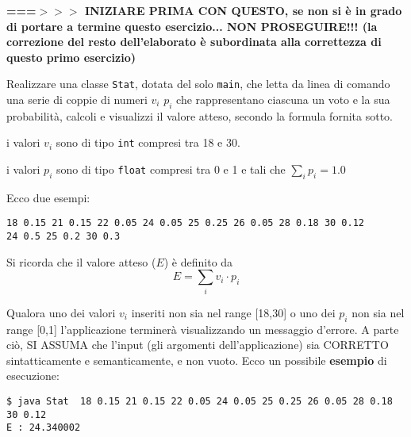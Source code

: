 \documentclass[12pt]{article}
\begin{document}
\textbf{===$>>>$ INIZIARE PRIMA CON QUESTO,
se non si è in grado di portare a termine questo esercizio...
NON PROSEGUIRE!!!
(la correzione del resto dell'elaborato è subordinata alla correttezza di questo primo esercizio)}

\medskip


Realizzare una classe \texttt{Stat}, dotata del solo \texttt{main},
che letta da linea di comando una serie di coppie di numeri $v_i$ $p_i$
che rappresentano ciascuna un voto e la sua probabilità, calcoli e visualizzi il valore atteso, secondo la formula fornita sotto.
\begin{compactitem}
\item i valori $v_i$ sono di tipo \texttt{int} compresi tra 18 e 30.
\item i valori $p_i$ sono di tipo \texttt{float} compresi tra 0 e 1 e tali che $\sum_{i} p_i = 1.0$
\end{compactitem}


Ecco due esempi:
\begin{verbatim}
18 0.15 21 0.15 22 0.05 24 0.05 25 0.25 26 0.05 28 0.18 30 0.12
24 0.5 25 0.2 30 0.3
\end{verbatim} 
Si ricorda che il valore atteso ($E$) \`e definito da
$$E = \sum_{i} v_i \cdot p_i$$

Qualora uno dei valori $v_i$ inseriti non sia nel range [18,30] o uno dei $p_i$ non sia nel range [0,1]
l'applicazione terminerà visualizzando un messaggio d'errore.
A parte ciò, SI ASSUMA che l'input (gli argomenti dell'applicazione)
sia CORRETTO sintatticamente e semanticamente, e non vuoto.
Ecco un possibile \textbf{esempio} di esecuzione:

\begin{verbatim}
$ java Stat  18 0.15 21 0.15 22 0.05 24 0.05 25 0.25 26 0.05 28 0.18 30 0.12
E : 24.340002
\end{verbatim}
\end{document}
